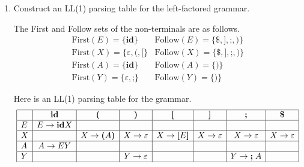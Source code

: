 \documentclass[11pt]{article}
\begin{document}
\begin{enumerate}
\begin{enumerate}
\item Construct an LL(1) parsing table for the left-factored grammar.

The First and Follow sets of the non-terminals are as follows.
\[
\begin{array}{ll}
\mathrm{First}(E) = \{ \mathbf{id} \}
& \mathrm{Follow}(E)
= \{ \textbf{\$}, \textbf{]}, \textbf{;}, \textbf{)} \} \\
\mathrm{First}(X) = \{ \varepsilon, \textbf{(}, \textbf{[} \}
& \mathrm{Follow}(X)
= \{ \textbf{\$}, \textbf{]}, \textbf{;}, \textbf{)} \} \\
\mathrm{First}(A) = \{ \mathbf{id} \}
& \mathrm{Follow}(A) = \{ \textbf{)} \} \\
\mathrm{First}(Y) = \{ \varepsilon, \textbf{;} \}
& \mathrm{Follow}(Y) = \{ \textbf{)} \}
\end{array}
\]

Here is an LL(1) parsing table for the grammar.
\[
\begin{array}{|l|c|c|c|c|c|c|c|}
\hline
& \mathbf{id} & \textbf{(} & \textbf{)} & \textbf{[} & \textbf{]}
& \textbf{;} & \textbf{\$} \\
\hline
E & E \rightarrow \mathbf{id} X & & & & & & \\
\hline
X & & X \rightarrow \textbf{(} A \textbf{)}
& X \rightarrow \varepsilon & X \rightarrow \textbf{[} E \textbf{]}
& X \rightarrow \varepsilon & X \rightarrow \varepsilon
& X \rightarrow \varepsilon \\
\hline
A & A \rightarrow EY & & & & & & \\
\hline
Y & & & Y \rightarrow \varepsilon & & & Y \rightarrow \textbf{;} \; A
& \\
\hline
\end{array}
\]


\end{enumerate}
\end{enumerate}
\end{document}
